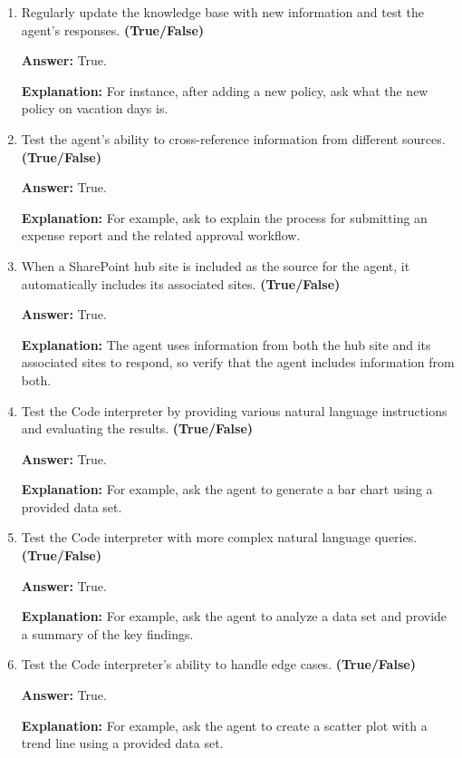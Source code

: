 \documentclass[10pt]{article}
\begin{document}
\begin{enumerate}[leftmargin=*]
\textbf{Answer:} True.

\textbf{Explanation:} For example, ask what the company policy on remote work is.

\item Regularly update the knowledge base with new information and test the agent's responses. \textbf{(True/False)}

\textbf{Answer:} True.

\textbf{Explanation:} For instance, after adding a new policy, ask what the new policy on vacation days is.

\item Test the agent's ability to cross-reference information from different sources. \textbf{(True/False)}

\textbf{Answer:} True.

\textbf{Explanation:} For example, ask to explain the process for submitting an expense report and the related approval workflow.

\item When a SharePoint hub site is included as the source for the agent, it automatically includes its associated sites. \textbf{(True/False)}

\textbf{Answer:} True.

\textbf{Explanation:} The agent uses information from both the hub site and its associated sites to respond, so verify that the agent includes information from both.

\item Test the Code interpreter by providing various natural language instructions and evaluating the results. \textbf{(True/False)}

\textbf{Answer:} True.

\textbf{Explanation:} For example, ask the agent to generate a bar chart using a provided data set.

\item Test the Code interpreter with more complex natural language queries. \textbf{(True/False)}

\textbf{Answer:} True.

\textbf{Explanation:} For example, ask the agent to analyze a data set and provide a summary of the key findings.

\item Test the Code interpreter's ability to handle edge cases. \textbf{(True/False)}

\textbf{Answer:} True.

\textbf{Explanation:} For example, ask the agent to create a scatter plot with a trend line using a provided data set.


\end{enumerate}
\end{document}
